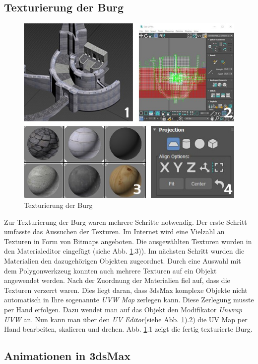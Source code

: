 \subsection{Texturierung der Burg}

\begin{figure}[h]
	\centering
	\includegraphics[width=0.95 \linewidth]{Abbildungen/3dsMax/Texturierung/Texturierung}
	\caption{Texturierung der Burg}
	\label{fig:textur}
\end{figure}

Zur Texturierung der Burg waren mehrere Schritte notwendig. Der erste Schritt umfasste das Aussuchen der Texturen. Im Internet wird eine Vielzahl an Texturen in Form von Bitmaps angeboten. Die ausgewählten Texturen wurden in den Materialeditor eingefügt (siehe Abb. \ref{fig:textur}.3)). Im nächsten Schritt wurden die Materialien den dazugehörigen Objekten zugeordnet. Durch eine Auswahl mit dem Polygonwerkzeug konnten auch mehrere Texturen auf ein Objekt angewendet werden. Nach der Zuordnung der Materialien fiel auf, dass die Texturen verzerrt waren. Dies liegt daran, dass 3dsMax komplexe Objekte nicht automatisch in Ihre sogenannte \textit{UVW Map} zerlegen kann. Diese Zerlegung musste per Hand erfolgen. Dazu wendet man auf das Objekt den Modifikator \textit{Unwrap UVW} an. Nun kann man über den \textit{UV Editor}(siehe Abb. \ref{fig:textur}).2) die UV Map per Hand bearbeiten, skalieren und drehen. Abb. \ref{fig:textur}.1 zeigt die fertig texturierte Burg.
\newpage

\subsection{Animationen in 3dsMax}
